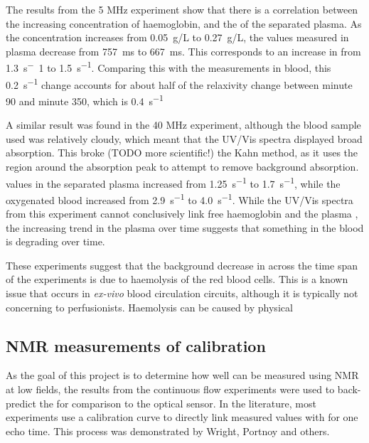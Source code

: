The results from the 5 MHz experiment show that there is a correlation between the increasing concentration of haemoglobin, and the \Rtwo of the separated plasma.
As the concentration increases from \SI{0.05}{g/L} to \SI{0.27}{g/L}, the \Ttwo values measured in plasma decrease from \SI{757}{ms} to \SI{667}{ms}.
This corresponds to an increase in \Rtwo from \SI{1.3}{s^-1} to \SI{1.5}{s^{-1}}.
Comparing this with the \Rtwo measurements in blood, this \SI{0.2}{s^{-1}} change accounts for about half of the relaxivity change between minute 90 and minute 350, which is \SI{0.4}{s^{-1}}

A similar result was found in the 40 MHz experiment, although the blood sample used was relatively cloudy, which meant that the UV/Vis spectra displayed broad absorption.
This broke (TODO more scientific!) the Kahn method, as it uses the region around the absorption peak to attempt to remove background absorption.
\Rtwo values in the separated plasma increased from \SI{1.25}{s^{-1}} to \SI{1.7}{s^{-1}}, while the oxygenated blood increased from \SI{2.9}{s^{-1}} to \SI{4.0}{s^{-1}}.
While the UV/Vis spectra from this experiment cannot conclusively link free haemoglobin and the plasma \Rtwo, the increasing trend in the plasma \Rtwo over time suggests that something in the blood is degrading over time.

These experiments suggest that the background decrease in \Ttwo across the time span of the experiments is due to haemolysis of the red blood cells.
This is a known issue that occurs in \textit{ex-vivo} blood circulation circuits, although it is typically not concerning to perfusionists.
Haemolysis can be caused by physical

\subsection{NMR measurements of \SOtwo calibration}
As the goal of this project is to determine how well \SOtwo can be measured using NMR at low fields, the results from the continuous flow experiments were used to back-predict the \SOtwo for comparison to the optical sensor.
In the literature, most experiments use a calibration curve to directly link measured \Ttwo values with \SOtwo for one echo time.
This process was demonstrated by Wright\cite{WrightEstimatingoxygensaturation1991}, Portnoy\cite{PortnoyRelaxationpropertieshuman2017} and others.

